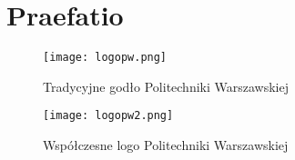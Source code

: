 \newpage %
\section{Praefatio}
\lipsum[1] \cite{goossens93}
\begin{figure}[!h]
    \label{fig:tradycyjne-logo-pw}
    \centering \texttt{[image: logopw.png]}
    \caption{Tradycyjne godło Politechniki Warszawskiej}
\end{figure}
\lipsum[2-3]
\begin{figure}[!h]
	\label{fig:nowe-logo-pw}
	\centering \texttt{[image: logopw2.png]}
	\caption{Współczesne logo Politechniki Warszawskiej}
\end{figure}
\lipsum[4-6]
